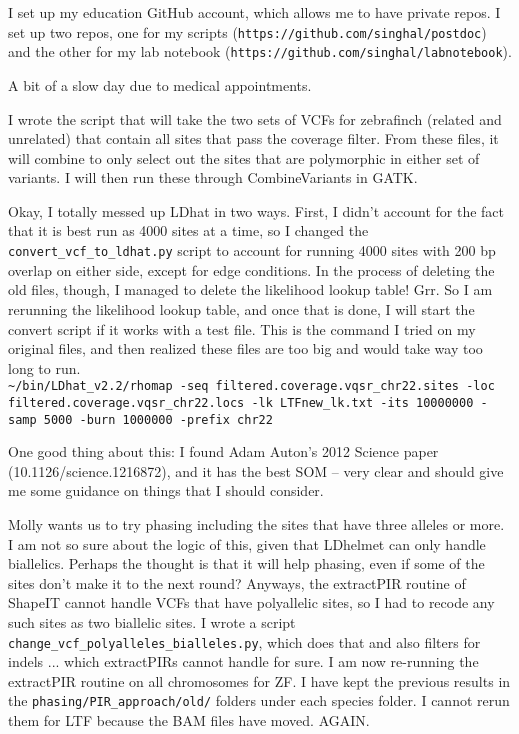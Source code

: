 \documentclass[idxtotoc,hyperref,openany,oneside]{labbook} %
\begin{document}
I set up my education GitHub account, which allows me to have private repos. I set up two repos, one for my scripts (\texttt{https://github.com/singhal/postdoc}) and the other for my lab notebook (\texttt{https://github.com/singhal/labnotebook}).


A bit of a slow day due to medical appointments.

I wrote the script that will take the two sets of VCFs for zebrafinch (related and unrelated) that contain all sites that pass the coverage filter. From these files, it will combine to only select out the sites that are polymorphic in either set of variants. I will then run these through CombineVariants in GATK.

Okay, I totally messed up LDhat in two ways. First, I didn't account for the fact that it is best run as 4000 sites at a time, so I changed the \verb+convert_vcf_to_ldhat.py+ script to account for running 4000 sites with 200 bp overlap on either side, except for edge conditions. In the process of deleting the old files, though, I managed to delete the likelihood lookup table! Grr. So I am rerunning the likelihood lookup table, and once that is done, I will start the convert script if it works with a test file. This is the command I tried on my original files, and then realized these files are too big and would take way too long to run. \\
\verb+~/bin/LDhat_v2.2/rhomap -seq filtered.coverage.vqsr_chr22.sites -loc filtered.coverage.vqsr_chr22.locs -lk LTFnew_lk.txt -its 10000000 -samp 5000 -burn 1000000 -prefix chr22+

One good thing about this: I found Adam Auton's 2012 Science paper (10.1126/science.1216872), and it has the best SOM -- very clear and should give me some guidance on things that I should consider.


Molly wants us to try phasing including the sites that have three alleles or more. I am not so sure about the logic of this, given that LDhelmet can only handle biallelics. Perhaps the thought is that it will help phasing, even if some of the sites don't make it to the next round? Anyways, the extractPIR routine of ShapeIT cannot handle VCFs that have polyallelic sites, so I had to recode any such sites as two biallelic sites. I wrote a script \verb+change_vcf_polyalleles_bialleles.py+, which does that and also filters for indels ... which extractPIRs cannot handle for sure. I am now re-running the extractPIR routine on all chromosomes for ZF. I have kept the previous results in the \verb+phasing/PIR_approach/old/+ folders under each species folder. I cannot rerun them for LTF because the BAM files have moved. AGAIN.\\
\end{document}
